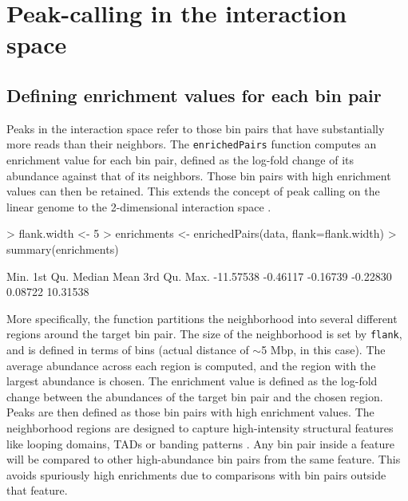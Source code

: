 \documentclass[12pt]{report}
\renewenvironment{Schunk}{\vspace{0pt}}{\vspace{0pt}}
\newcommand{\code}[1]{{\small\texttt{#1}}}
\begin{document}

\section{Peak-calling in the interaction space}

\subsection{Defining enrichment values for each bin pair}
Peaks in the interaction space refer to those bin pairs that have substantially more reads than their neighbors.
The \code{enrichedPairs} function computes an enrichment value for each bin pair, defined as the log-fold change of its abundance against that of its neighbors.
Those bin pairs with high enrichment values can then be retained.
This extends the concept of peak calling on the linear genome to the 2-dimensional interaction space \citep{rao2014kilobase}.

\begin{Schunk}
\begin{Sinput}
> flank.width <- 5
> enrichments <- enrichedPairs(data, flank=flank.width)
> summary(enrichments)   
\end{Sinput}
\begin{Soutput}
     Min.   1st Qu.    Median      Mean   3rd Qu.      Max. 
-11.57538  -0.46117  -0.16739  -0.22830   0.08722  10.31538 
\end{Soutput}
\end{Schunk}

More specifically, the function partitions the neighborhood into several different regions around the target bin pair.
The size of the neighborhood is set by \code{flank}, and is defined in terms of bins (actual distance of $\sim$5 Mbp, in this case).
The average abundance across each region is computed, and the region with the largest abundance is chosen.
The enrichment value is defined as the log-fold change between the abundances of the target bin pair and the chosen region.
Peaks are then defined as those bin pairs with high enrichment values.
The neighborhood regions are designed to capture high-intensity structural features like looping domains, TADs or banding patterns \citep{rao2014kilobase}.
Any bin pair inside a feature will be compared to other high-abundance bin pairs from the same feature.
This avoids spuriously high enrichments due to comparisons with bin pairs outside that feature.
\end{document}
